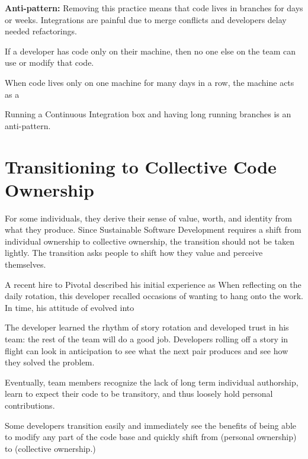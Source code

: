 \begin{table}[]
\textbf{Anti-pattern:} Removing this practice means that code lives in branches for days or weeks. Integrations are painful due to merge conflicts and developers delay needed refactorings.

If a developer has code only on their machine, then no one else on the team can use or modify that code. 

When code lives only on one machine for many days in a row, the machine acts as a  

Running a Continuous Integration box and having long running branches is an anti-pattern.


\section{Transitioning to Collective Code Ownership}
\label{Transitioning}
For some individuals, they derive their sense of value, worth, and identity from what they produce. Since Sustainable Software Development requires a shift from individual ownership to collective ownership, the transition should not be taken lightly. The transition asks people to shift how they value and perceive themselves. 

A recent hire to Pivotal described his initial experience as  When reflecting on the daily rotation, this developer recalled occasions of wanting to hang onto the work.  In time, his attitude of  evolved into  

The developer learned the rhythm of story rotation and developed trust in his team: the rest of the team will do a good job. Developers rolling off a story in flight can look in anticipation to see what the next pair produces and see how they solved the problem. 

Eventually, team members recognize the lack of long term individual authorship, learn to expect their code to be transitory, and thus loosely hold personal contributions.   

Some developers transition easily and immediately see the benefits of being able to modify any part of the code base and quickly shift from  (personal ownership) to  (collective ownership.)


\end{table}
